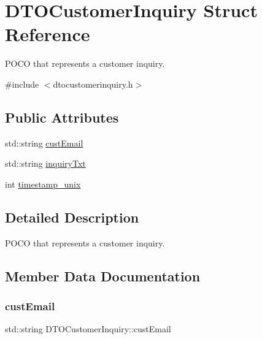 \hypertarget{struct_d_t_o_customer_inquiry}{}\section{D\+T\+O\+Customer\+Inquiry Struct Reference}
\label{struct_d_t_o_customer_inquiry}


P\+O\+CO that represents a customer inquiry.  




{\ttfamily \#include $<$dtocustomerinquiry.\+h$>$}

\subsection*{Public Attributes}
\begin{DoxyCompactItemize}
\item 
std\+::string \mbox{\hyperlink{struct_d_t_o_customer_inquiry_aeab8e1bbcb3bb2776a1d447cd1ef421f}{cust\+Email}}
\item 
std\+::string \mbox{\hyperlink{struct_d_t_o_customer_inquiry_a22e1c2babfe2efd005d4e9e048a13f89}{inquiry\+Txt}}
\item 
int \mbox{\hyperlink{struct_d_t_o_customer_inquiry_a77170a12cf54b579b1fe6bb707f325f3}{timestamp\+\_\+unix}}
\end{DoxyCompactItemize}


\subsection{Detailed Description}
P\+O\+CO that represents a customer inquiry. 



\subsection{Member Data Documentation}
\mbox{\label{struct_d_t_o_customer_inquiry_aeab8e1bbcb3bb2776a1d447cd1ef421f}} 
\subsubsection{\texorpdfstring{custEmail}{custEmail}}
{\footnotesize\ttfamily std\+::string D\+T\+O\+Customer\+Inquiry\+::cust\+Email}


